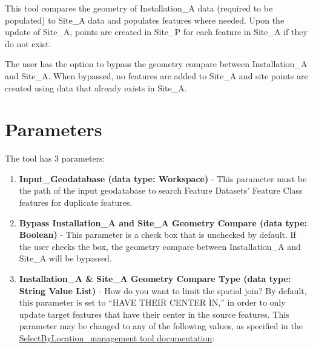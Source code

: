 \documentclass[openany]{book}
\providecommand{\tightlist}{%
  \setlength{\itemsep}{0pt}\setlength{\parskip}{0pt}}
\theoremstyle{definition}
\theoremstyle{definition}
\theoremstyle{definition}
\theoremstyle{remark}
\begin{document}
This tool compares the geometry of Installation\_A data (required to be
populated) to Site\_A data and populates features where needed. Upon the
update of Site\_A, points are created in Site\_P for each feature in
Site\_A if they do not exist.

The user has the option to bypass the geometry compare between
Installation\_A and Site\_A. When bypassed, no features are added to
Site\_A and site points are created using data that already exists in
Site\_A.

\section{Parameters}\label{parameters-1}

The tool has 3 parameters:

\begin{enumerate}
\def\labelenumi{\arabic{enumi}.}
\tightlist
\item
  \textbf{Input\_Geodatabase (data type: Workspace)} - This parameter
  must be the path of the input geodatabase to search Feature Datasets'
  Feature Class features for duplicate features.\\
\item
  \textbf{Bypass Installation\_A and Site\_A Geometry Compare (data
  type: Boolean)} - This parameter is a check box that is unchecked by
  default. If the user checks the box, the geometry compare between
  Installation\_A and Site\_A will be bypassed.
\item
  \textbf{Installation\_A \& Site\_A Geometry Compare Type (data type:
  String Value List)} - How do you want to limit the spatial join? By
  default, this parameter is set to ``HAVE THEIR CENTER IN,'' in order
  to only update target features that have their center in the source
  features. This parameter may be changed to any of the following
  values, as specified in the
  \href{http://desktop.arcgis.com/en/arcmap/latest/tools/data-management-toolbox/select-layer-by-location.htm}{SelectByLocation\_management
  tool documentation}:


\end{enumerate}
\end{document}
